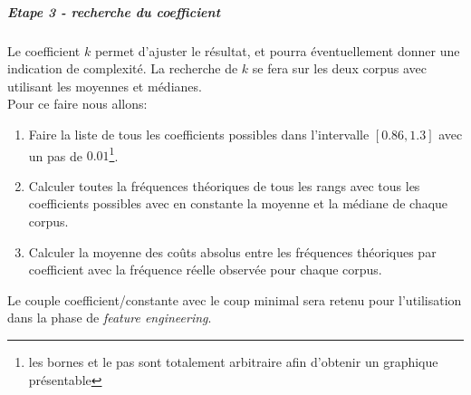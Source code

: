 \documentclass[a4paper,12pt]{article}
\begin{document}
		\subparagraph{Etape 3 - recherche du coefficient}
			Le coefficient $k$ permet d'ajuster le résultat, et pourra éventuellement donner une indication de complexité. La recherche de $k$ se fera sur les deux corpus avec utilisant les moyennes et médianes.\\
			
			Pour ce faire nous allons:

			\begin{enumerate}
				\item Faire la liste de tous les coefficients possibles dans l'intervalle $[0.86, 1.3]$ avec un pas de $0.01$\footnote{les bornes et le pas sont totalement arbitraire afin d'obtenir un graphique présentable}.
				\item Calculer toutes la fréquences théoriques de tous les rangs avec tous les coefficients possibles avec en constante la moyenne et la médiane de chaque corpus.
				\item Calculer la moyenne des coûts absolus entre les fréquences théoriques par coefficient avec la fréquence réelle observée pour chaque corpus.\\
			\end{enumerate}
			
			Le couple coefficient/constante avec le coup minimal sera retenu pour l'utilisation dans la phase de \emph{feature engineering}. \\	
			
\end{document}
